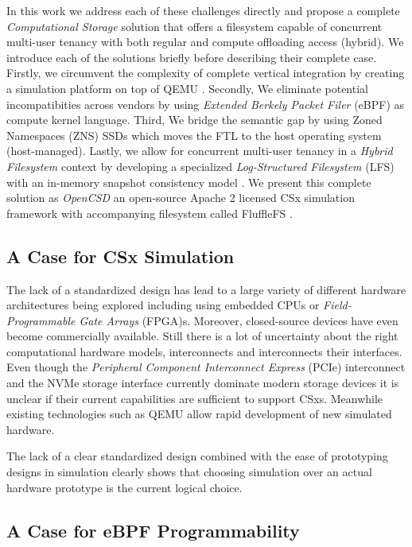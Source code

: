 
In this work we address each of these challenges directly and propose a
complete \textit{Computational Storage} solution that offers a filesystem
capable of concurrent multi-user tenancy with both regular and compute
offloading access (hybrid). We introduce each of the solutions briefly before
describing their complete case. Firstly, we circumvent the complexity of
complete vertical integration by creating a simulation platform on top of
QEMU \cite{qemu}. Secondly, We eliminate potential incompatibities across vendors
by using \textit{Extended Berkely Packet Filer} (eBPF) \cite{what-ebpf} as
compute kernel language. Third, We bridge the semantic gap by using Zoned
Namespaces (ZNS) \cite{zns} SSDs which moves the FTL to the host operating
system (host-managed). Lastly, we allow for concurrent multi-user tenancy in
a \textit{Hybrid Filesystem} context by developing a specialized
\textit{Log-Structured Filesystem} (LFS) \cite{Rosenblum1992TheDA} with an
in-memory snapshot consistency model \cite{Viotti2016ConsistencyIN}. We present
this complete solution as \textit{OpenCSD} an open-source Apache 2 licensed CSx
simulation framework with accompanying filesystem called
FluffleFS \cite{qemu-csd}.

\subsection*{A Case for CSx Simulation}

The lack of a standardized design has lead to a large variety of different
hardware architectures being explored including using embedded CPUs or
\textit{Field-Programmable Gate Arrays} (FPGA)s. Moreover, closed-source
devices have even become commercially available. Still there is a lot of
uncertainty about the right computational hardware models, interconnects and
interconnects their interfaces. Even though the \textit{Peripheral Component
Interconnect Express} (PCIe) interconnect and the NVMe storage interface
currently dominate modern storage devices it is unclear if their current
capabilities are sufficient to support CSxs. Meanwhile existing technologies
such as QEMU allow rapid development of new simulated hardware.

The lack of a clear standardized design combined with the ease of prototyping
designs in simulation clearly shows that choosing simulation over an actual
hardware prototype is the current logical choice.

\subsection*{A Case for eBPF Programmability}

